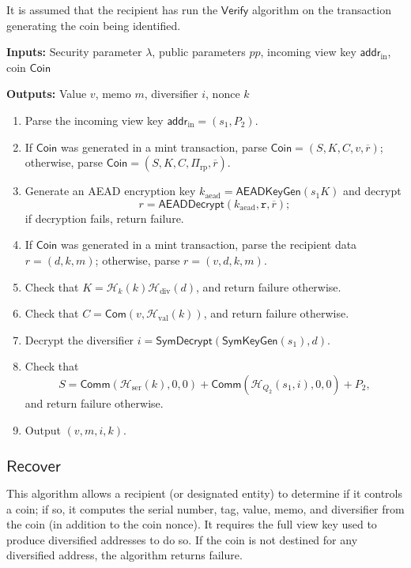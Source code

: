 \documentclass{llncs}
\newcommand{\hash}{\mathcal{H}}
\newcommand{\func}[1]{\mathsf{#1}}
\newcommand{\addr}{\func{addr}}
\newcommand{\com}{\func{Com}}
\newcommand{\comm}{\func{Comm}}
\begin{document}
It is assumed that the recipient has run the $\func{Verify}$ algorithm on the transaction generating the coin being identified.

\textbf{Inputs:} Security parameter $\lambda$, public parameters $pp$, incoming view key $\addr_{\text{in}}$, coin $\func{Coin}$

\textbf{Outputs:} Value $v$, memo $m$, diversifier $i$, nonce $k$

\begin{enumerate}
\item Parse the incoming view key $\addr_{\text{in}} = (s_1, P_2)$.
\item If $\func{Coin}$ was generated in a mint transaction, parse $\func{Coin} = (S, K, C, v, \overline{r})$; otherwise, parse $\func{Coin} = (S, K, C, \Pi_{\text{rp}}, \overline{r})$.
\item Generate an AEAD encryption key $k_{\text{aead}} = \func{AEADKeyGen}(s_1 K)$ and decrypt $$r = \func{AEADDecrypt}(k_{\text{aead}},\texttt{r},\overline{r});$$ if decryption fails, return failure.
\item If $\func{Coin}$ was generated in a mint transaction, parse the recipient data $r = (d, k, m)$; otherwise, parse $r = (v, d, k, m)$.
\item Check that $K = \hash_k(k)\hash_{\text{div}}(d)$, and return failure otherwise.
\item Check that $C = \com(v,\hash_{\text{val}}(k))$, and return failure otherwise.
\item Decrypt the diversifier $i = \func{SymDecrypt}(\func{SymKeyGen}(s_1),d)$.
\item Check that $$S = \comm(\hash_{\text{ser}}(k),0,0) + \comm(\hash_{Q_2}(s_1,i),0,0) + P_2,$$ and return failure otherwise.
\item Output $(v, m, i, k)$.
\end{enumerate}


\subsection{\texorpdfstring{$\func{Recover}$}{Recover}}

This algorithm allows a recipient (or designated entity) to determine if it controls a coin; if so, it computes the serial number, tag, value, memo, and diversifier from the coin (in addition to the coin nonce).
It requires the full view key used to produce diversified addresses to do so.
If the coin is not destined for any diversified address, the algorithm returns failure.
\end{document}
